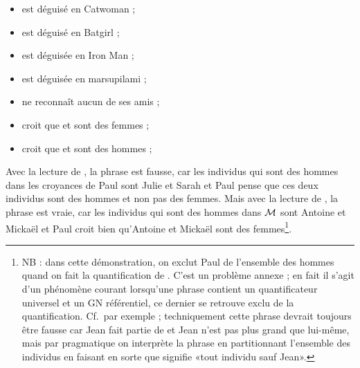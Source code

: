 \begin{exo}
\begin{solu}
\begin{enumerate}
\begin{itemize}
\item {} est déguisé en Catwoman ;
\item {} est déguisé en Batgirl ;
\item {} est déguisée en Iron Man ;
\item {} est déguisée en marsupilami ;
\item {} ne reconnaît aucun de ses amis ;
\item {} croit que  et  sont des femmes ;
\item {} croit que  et  sont des hommes ;
\end{itemize}

Avec la lecture  de , la phrase est fausse, car les individus qui sont des hommes dans les croyances de Paul sont Julie et Sarah et Paul pense que ces deux individus sont des hommes et non pas des femmes.  Mais avec la lecture  de , la phrase est vraie, car les individus qui sont des hommes dans $\mathcal{M}$ sont Antoine et Mickaël et Paul croit bien qu'Antoine et Mickaël sont des femmes\footnote{NB : dans cette démonstration, on exclut Paul de l'ensemble des hommes quand on fait la quantification de . C'est un problème annexe ; en fait il s'agit d'un phénomène courant lorsqu'une phrase contient un quantificateur universel et un GN référentiel, ce dernier se retrouve exclu de la quantification. Cf.\ par exemple  ; techniquement cette phrase devrait toujours être fausse car Jean fait partie de  et Jean n'est pas plus grand que lui-même, mais par pragmatique on interprète la phrase en partitionnant l'ensemble des individus en faisant en sorte que  signifie «tout individu sauf Jean».}. 


\end{enumerate}
\end{solu}
\end{exo}
